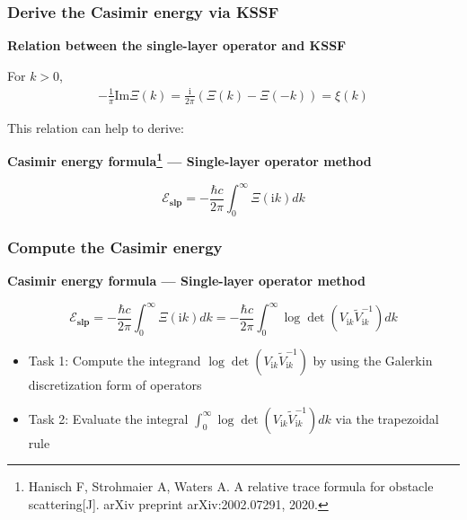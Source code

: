 \documentclass[dvipsnames,10pt]{beamer}
\begin{document}
\begin{frame}
    \frametitle{Derive the Casimir energy via KSSF}
      \begin{tcolorbox}
    \textbf{Relation between the single-layer operator and KSSF}
    
        For $k>0$,
        \begin{align*}
        -\frac{1}{\pi}\text{Im}\Xi(k) = \frac{\mathrm{i}}{2\pi}(\Xi(k) - \Xi(-k)) = \xi(k)
    \end{align*}
    \end{tcolorbox}
    This relation can help to derive:
    \begin{tcolorbox}
    \textbf{Casimir energy formula\footnote{Hanisch F, Strohmaier A, Waters A. A relative trace formula for obstacle scattering[J]. arXiv preprint arXiv:2002.07291, 2020.} ---
    Single-layer operator method}
    
    $$\mathcal{E}_{\textbf{slp}} =  -\frac{\hbar c}{2\pi}\int_{0}^{\infty}\Xi(\mathrm{i}k)dk$$
\end{tcolorbox}
\end{frame}
\begin{frame}
    \frametitle{Compute the Casimir energy}
    \begin{tcolorbox}
\textbf{Casimir energy formula ---
    Single-layer operator method}
    
    $$\mathcal{E}_{\textbf{slp}} =  -\frac{\hbar c}{2\pi}\int_{0}^{\infty}\Xi(\mathrm{i}k)dk = -\frac{\hbar c}{2\pi}\int_{0}^{\infty}\log\det\left(V_{\mathrm{i}k}\tilde{V}_{\mathrm{i}k}^{-1}\right)dk$$
\end{tcolorbox}

\begin{itemize}
    \item Task 1: Compute the integrand $\log\det\left(V_{\mathrm{i}k}\tilde{V}_{\mathrm{i}k}^{-1}\right)$ by using the Galerkin discretization form of operators
    \vspace{0.3cm}
    \item Task 2: Evaluate the integral $\int_{0}^{\infty}\log\det\left(V_{\mathrm{i}k}\tilde{V}_{\mathrm{i}k}^{-1}\right)dk$ via the trapezoidal rule
\end{itemize}


\end{frame}
\end{document}
